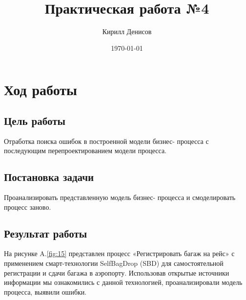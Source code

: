 \documentclass[a4paper,14pt]{extarticle}
\author{Кирилл Денисов}
\title{Практическая работа №4}
\date{\today}
\newcommand{\pathToCommonFolder}{/home/denilai/Documents/repos/latex/Common}
\begin{document}
	\thispagestyle{empty}
	
	\newpage
	\newpage
\section*{Ход работы}

\subsection*{Цель работы}
Отработка поиска ошибок в построенной модели бизнес-
процесса с последующим перепроектированием модели процесса.

\subsection*{Постановка задачи}
Проанализировать представленную модель бизнес-
процесса и смоделировать процесс заново.


\subsection*{Результат работы}
На рисунке A.\ref{fig:15} представлен процесс «Регистрировать багаж на рейс» с
применением смарт-технологии SelfBagDrop (SBD) для самостоятельной регистрации
и сдачи багажа в аэропорту. Использовав открытые источники информации
мы ознакомились с данной технологией, проанализировали модель процесса, выявили ошибки.

\newpage
{}
\end{document}
